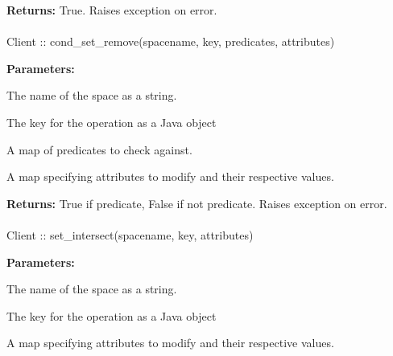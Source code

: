 \noindent\textbf{Returns:}
True.  Raises exception on error.

\paragraph{}
\label{api:java:cond_set_remove}
\begin{javacode}
Client :: cond_set_remove(spacename, key, predicates, attributes)
\end{javacode}
\funcdesc 

\noindent\textbf{Parameters:}
\begin{description}[labelindent=\widthof{{\code{predicates}}},leftmargin=*,noitemsep,nolistsep,align=right]
\item[\code{spacename}] The name of the space as a string.
\item[\code{key}] The key for the operation as a Java object
\item[\code{predicates}] A map of predicates to check against.
\item[\code{attributes}] A map specifying attributes to modify and their respective values.
\end{description}

\noindent\textbf{Returns:}
True if predicate, False if not predicate.  Raises exception on error.

\paragraph{}
\label{api:java:set_intersect}
\begin{javacode}
Client :: set_intersect(spacename, key, attributes)
\end{javacode}
\funcdesc 

\noindent\textbf{Parameters:}
\begin{description}[labelindent=\widthof{{\code{attributes}}},leftmargin=*,noitemsep,nolistsep,align=right]
\item[\code{spacename}] The name of the space as a string.
\item[\code{key}] The key for the operation as a Java object
\item[\code{attributes}] A map specifying attributes to modify and their respective values.
\end{description}

